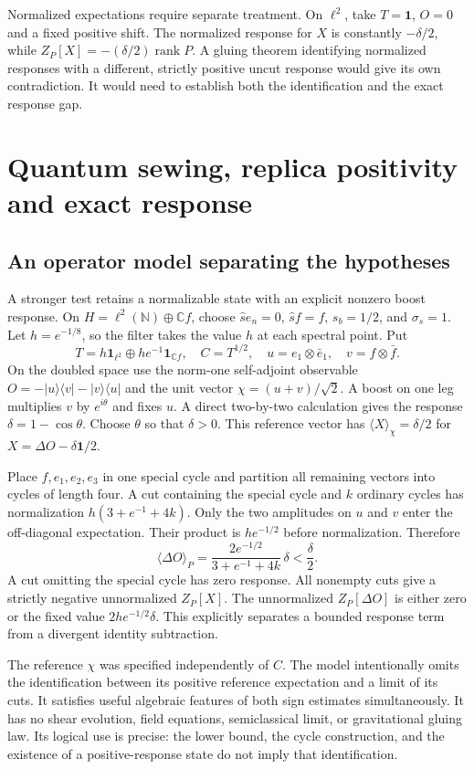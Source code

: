 \documentclass[11pt]{article}
\newcommand{\id}{\mathbf{1}}
\newcommand{\areaop}{\hat s}
\DeclareMathOperator{\rank}{rank}
\newcommand{\parttitle}[2]{\section{#1}}
\begin{document}
Normalized expectations require separate treatment. On $\ell^2$, take $T=\id$, $O=0$ and a fixed positive shift. The normalized response for $X$ is constantly $-\delta/2$, while $Z_P[X]=-(\delta/2)\rank P$. A gluing theorem identifying normalized responses with a different, strictly positive uncut response would give its own contradiction. It would need to establish both the identification and the exact response gap.

\parttitle{Quantum sewing, replica positivity and exact response}{Controls for gluing}\label{sec:controls}
\subsection{An operator model separating the hypotheses}
A stronger test retains a normalizable state with an explicit nonzero boost response. On $H=\ell^2(\mathbb N)\oplus\mathbb C f$, choose $\areaop e_n=0$, $\areaop f=f$, $s_b=1/2$, and $\sigma_s=1$. Let $h=e^{-1/8}$, so the filter takes the value $h$ at each spectral point. Put
\[
 T=h\id_{\ell^2}\oplus he^{-1}\id_{\mathbb Cf},\quad C=T^{1/2},
 \quad u=e_1\otimes\bar e_1,\quad v=f\otimes\bar f .
\]
On the doubled space use the norm-one self-adjoint observable $O=-|u\rangle\langle v|-|v\rangle\langle u|$ and the unit vector $\chi=(u+v)/\sqrt{2}$. A boost on one leg multiplies $v$ by $e^{i\theta}$ and fixes $u$. A direct two-by-two calculation gives the response $\delta=1-\cos\theta$. Choose $\theta$ so that $\delta>0$. This reference vector has $\langle X\rangle_\chi=\delta/2$ for $X=\Delta O-\delta\id/2$.

Place $f,e_1,e_2,e_3$ in one special cycle and partition all remaining vectors into cycles of length four. A cut containing the special cycle and $k$ ordinary cycles has normalization $h(3+e^{-1}+4k)$. Only the two amplitudes on $u$ and $v$ enter the off-diagonal expectation. Their product is $he^{-1/2}$ before normalization. Therefore
\[
 \langle\Delta O\rangle_P
 =\frac{2e^{-1/2}}{3+e^{-1}+4k}\,\delta<\frac{\delta}{2}.
\]
A cut omitting the special cycle has zero response. All nonempty cuts give a strictly negative unnormalized $Z_P[X]$. The unnormalized $Z_P[\Delta O]$ is either zero or the fixed value $2he^{-1/2}\delta$. This explicitly separates a bounded response term from a divergent identity subtraction.

The reference $\chi$ was specified independently of $C$. The model intentionally omits the identification between its positive reference expectation and a limit of its cuts. It satisfies useful algebraic features of both sign estimates simultaneously. It has no shear evolution, field equations, semiclassical limit, or gravitational gluing law. Its logical use is precise: the lower bound, the cycle construction, and the existence of a positive-response state do not imply that identification.
\end{document}
